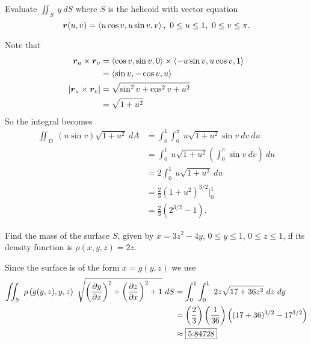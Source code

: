 \documentclass[12pt]{exam}
\begin{document}
\begin{questions}
\newpage 

\question Evaluate \(\iint_S~y~dS\) where \(S\) is the helicoid with vector equation
\[
    \bm{r}(u,v) = \left\langle u\cos v,u\sin v, v \right\rangle,~0\le u \le 1,~ 0\le v \le \pi.
\]
\ifprintanswers
        \begin{solution}
            Note that
            \begin{align*}
                \bm{r}_u\times\bm{r}_v & = \left\langle \cos v,\sin v,0 \right\rangle\times \left\langle -u\sin v,u\cos v, 1 \right\rangle\\
                & = \left\langle \sin v,-\cos v,u \right\rangle\\
                |\bm{r}_u\times\bm{r}_v| & = \sqrt{\sin^2 v+\cos^2 v+u^2}\\
                    & = \sqrt{1+u^2}
            \end{align*}
            So the integral becomes 
            \begin{align*}
                \iint_D~(u\sin v)\sqrt{1+u^2}~dA & = \int_0^1\int_0^{\pi}~u\sqrt{1+u^2}\sin v~dv~du\\
                & = \int_0^1~u\sqrt{1+u^2}\left(\int_0^{\pi}\sin{v}~dv  \right)~du\\
                & = 2\int_0^1~u\sqrt{1+u^2}~du\\
                & = \frac{2}{3}\left(1+u^2\right)^{3/2}\biggr|_0^1\\
                & = \boxed{\frac{2}{3}\left( 2^{3/2}-1 \right)}.
            \end{align*}
        \end{solution}
    \else
        \vfill
    \fi

\question Find the mass of the surface \(S\), given by \(x=3z^2-4y\), \(0\le y \le 1\), \(0\le z \le 1\), if its density function is \(\rho(x,y,z)=2z\).
\ifprintanswers
        \begin{solution}
            
                Since the surface is of the form \(x=g(y,z)\) we use
                \begin{align*}
                    \iint_S~\rho\left(g(y,z),y,z\right)~\sqrt{\left(\dfrac{\partial y}{\partial x}\right)^2+\left(\dfrac{\partial z}{\partial x}\right)^2+1}~dS & = \int_0^1\int_0^1~2z\sqrt{17+36z^2}~dz~dy\\
                        & = \left(\frac{2}{3}\right) \left(\frac{1}{36}\right) \left((17+36)^{3/2} - 17^{3/2} \right)\\
                        & \approx \boxed{5.84728}
                \end{align*}
        \end{solution}
    \else
        \vfill
    \fi


\end{questions}
\end{document}
